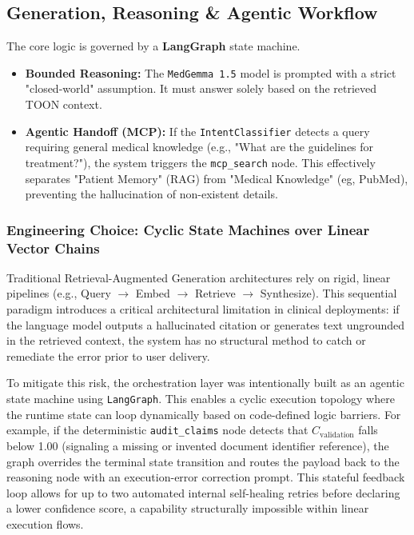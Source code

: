 



\subsection{Generation, Reasoning \& Agentic Workflow}
The core logic is governed by a \textbf{LangGraph} state machine.
\begin{itemize}
    \item \textbf{Bounded Reasoning:} The \texttt{MedGemma 1.5} model is prompted with a strict "closed-world" assumption. It must answer solely based on the retrieved TOON context.
    \item \textbf{Agentic Handoff (MCP):} If the \texttt{IntentClassifier} detects a query requiring general medical knowledge (e.g., "What are the guidelines for treatment?"), the system triggers the \texttt{mcp\_search} node. This effectively separates "Patient Memory" (RAG) from "Medical Knowledge" (eg, PubMed), preventing the hallucination of non-existent details.
\end{itemize}

\subsubsection{Engineering Choice: Cyclic State Machines over Linear Vector Chains}
Traditional Retrieval-Augmented Generation architectures rely on rigid, linear pipelines (e.g., Query $\rightarrow$ Embed $\rightarrow$ Retrieve $\rightarrow$ Synthesize). This sequential paradigm introduces a critical architectural limitation in clinical deployments: if the language model outputs a hallucinated citation or generates text ungrounded in the retrieved context, the system has no structural method to catch or remediate the error prior to user delivery.

To mitigate this risk, the orchestration layer was intentionally built as an agentic state machine using \texttt{LangGraph}. This enables a cyclic execution topology where the runtime state can loop dynamically based on code-defined logic barriers. For example, if the deterministic \texttt{audit\_claims} node detects that $C_{\text{validation}}$ falls below 1.00 (signaling a missing or invented document identifier reference), the graph overrides the terminal state transition and routes the payload back to the reasoning node with an execution-error correction prompt. This stateful feedback loop allows for up to two automated internal self-healing retries before declaring a lower confidence score, a capability structurally impossible within linear execution flows.

